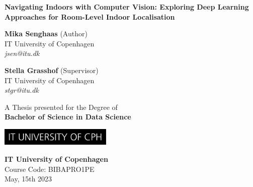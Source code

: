 \begin{titlepage}
  \begin{center}

    \vspace*{1cm}

    \textbf{\LARGE
    Navigating Indoors with Computer Vision: Exploring Deep Learning Approaches
    for Room-Level Indoor Localisation
    }

    \vspace{1.5cm}

    \begin{minipage}[t]{5cm}
      \centering
      \textbf{Mika Senghaas} (Author) \\
      IT University of Copenhagen \\
      \textit{jsen@itu.dk}
    \end{minipage}
    \hspace{1cm}
    \begin{minipage}[t]{5cm}
      \centering
      \textbf{Stella Grasshof} (Supervisor) \\
      IT University of Copenhagen \\
      \textit{stgr@itu.dk}
    \end{minipage}

    \vfill

    A Thesis presented for the Degree of \\
    \textbf{Bachelor of Science in Data Science}

    \vspace{0.8cm}

    \includegraphics[width=0.4\textwidth]{figures/itu.jpg}

    \vspace{0.8cm}


    \textbf{IT University of Copenhagen}\\
    Course Code: BIBAPRO1PE\\
    \vspace{.5cm}
    May, 15th 2023

  \end{center}
\end{titlepage}
